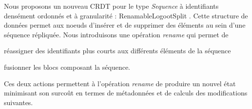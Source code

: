 Nous proposons un nouveau \ac{CRDT} pour le type \emph{Sequence} à identifiants densément ordonnés et à granularité : RenamableLogootSplit \cite{2020-rls-papoc-nicolas,2022-rls-tpds-nicolas}.
Cette structure de données permet aux noeuds d'insérer et de supprimer des éléments au sein d'une séquence répliquée.
Nous introduisons une opération \emph{rename} qui permet de
\begin{enumerate*}
  \item réassigner des identifiants plus courts aux différents éléments de la séquence
  \item fusionner les blocs composant la séquence.
\end{enumerate*}
Ces deux actions permettent à l'opération \emph{rename} de produire un nouvel état minimisant son surcoût en termes de métadonnées et de calculs des modifications suivantes.
